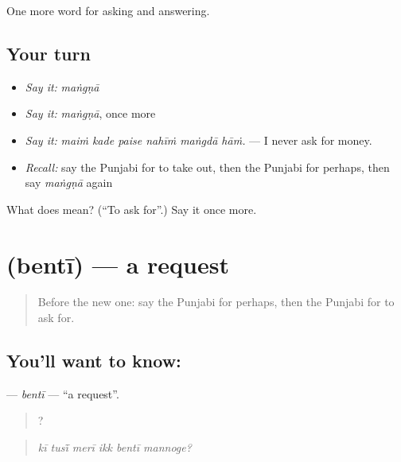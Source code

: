 \begin{grammarlens}[title={What you've built}]
One more word for asking and answering.
\end{grammarlens}

\subsection*{Your turn}
\begin{itemize}
\raggedright
  \item \emph{Say it:} \emph{maṅgṇā}
  \item \emph{Say it:} \emph{maṅgṇā}, once more
  \item \emph{Say it:} \emph{maiṁ kade paise nahīṁ maṅgdā hāṁ.} — I never ask for money.
  \item \emph{Recall:} say the Punjabi for to take out, then the Punjabi for perhaps, then say \emph{maṅgṇā} again
\end{itemize}

\begin{tcolorbox}[breakable,colback=teal!4,colframe=teal!35!black,title={Before you move on}]
What does  mean? (\textquotedblleft{}To ask for\textquotedblright{}.) Say it once more.
\end{tcolorbox}
\section[\texorpdfstring{\pa{ਬੇਨਤੀ} (bentī)}{ਬੇਨਤੀ (bentī)}]{ (bentī) — a request}

\label{lesson:PA-C337-benti}



\begin{quote}
Before the new one: say the Punjabi for perhaps, then the Punjabi for to ask for.
\end{quote}

\subsection*{You'll want to know: }
\textbf{} — \emph{bentī} — \textquotedblleft{}a request\textquotedblright{}.

\begin{quote}
     ?
\end{quote}

\begin{quote}
\emph{kī tusī̃ merī ikk bentī mannoge?}
\end{quote}

